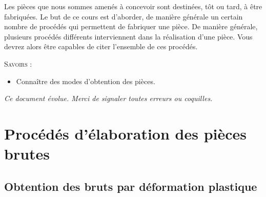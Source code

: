 \documentclass[11pt,oneside]{article}
\begin{document}
\vspace{.5cm}



Les pièces que nous sommes amenés à concevoir sont destinées, tôt ou tard, à être fabriquées. Le but de ce cours est d'aborder, de manière générale un certain nombre de procédés qui permettent de fabriquer une pièce. De manière générale, plusieurs procédés différents interviennent dans la réalisation d'une pièce. Vous devrez alors être capables de citer l'ensemble de ces procédés.






\begin{savoir}
\textsc{Savoirs :}
\begin{itemize}
\item Connaître des modes d'obtention des pièces.
\end{itemize}
\end{savoir}


\setlength{\parskip}{0ex plus 0.2ex minus 0ex}
 \renewcommand{\contentsname}{}
 \renewcommand{\baselinestretch}{1}

\tableofcontents

 \renewcommand{\baselinestretch}{1.2}
\setlength{\parskip}{2ex plus 0.5ex minus 0.2ex}

\textit{Ce document évolue. Merci de signaler toutes erreurs ou coquilles.}


\section{Procédés d'élaboration des pièces brutes}
\subsection{Obtention des bruts par déformation plastique}
\end{document}
